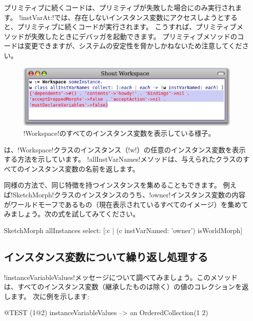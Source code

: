 \documentclass[a4paper,10pt,twoside]{book}
\begin{document}
プリミティブに続くコードは、プリミティブが失敗した場合にのみ実行されます。
\ct!instVarAt:!では、存在しないインスタンス変数にアクセスしようとすると、プリミティブに続くコードが実行されます。
こうすれば、プリミティブメソッドが失敗したときにデバッガを起動できます。
プリミティブメソッドのコードは変更できますが、\pharo システムの安定性を脅かしかねないため注意してください。

\begin{figure}[ht]\centering
	\includegraphics[width=\linewidth]{allInstanceVariables}
	\caption{\ct!Workspace!のすべてのインスタンス変数を表示している様子。}
\end{figure}

は、\ct!Workspace!クラスのインスタンス（\ct!w!）の任意のインスタンス変数を表示する方法を示しています。
\ct!allInstVarNames!メソッドは、与えられたクラスのすべてのインスタンス変数の名前を返します。

同様の方法で、同じ特徴を持つインスタンスを集めることもできます。
例えば\ct!SketchMorph!クラスのインスタンスのうち、\ct!owner!インスタンス変数の内容がワールドモーフであるもの（\ie 現在表示されているすべてのイメージ）を集めてみましょう。次の式を試してみてください。

\begin{code}{}
SketchMorph allInstances select: [:c | (c instVarNamed: 'owner') isWorldMorph]
\end{code}

\subsection{インスタンス変数について繰り返し処理する}

\ct!instanceVariableValues!メッセージについて調べてみましょう。このメソッドは、すべてのインスタンス変数（継承したものは除く）の値のコレクションを返します。
次に例を示します:
\begin{code}{@TEST}
(1@2) instanceVariableValues --> an OrderedCollection(1 2)
\end{code}
\end{document}
